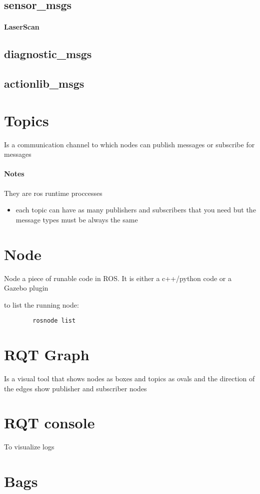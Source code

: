     \subsection{sensor\_msgs}
        \paragraph{LaserScan}
    \subsection{diagnostic\_msgs}
    \subsection{actionlib\_msgs}
\section{Topics}
    Is a communication channel to which nodes can publish messages or subscribe for messages

    \paragraph{Notes}
        They are ros runtime proccesses
        \begin{itemize}
            \item each topic can have as many publishers and subscribers that you need but the message types must be always the same
        \end{itemize}
\section{Node}
    Node a piece of runable code in ROS. It is either a c++/python code or a Gazebo plugin

    to list the running node:
    \begin{verbatim}
        rosnode list
    \end{verbatim}
\section{RQT Graph}
    Is a visual tool that shows nodes as boxes and topics as ovals and the direction of the edges show publisher and subscriber nodes
\section{RQT console}
    To visualize logs
\section{Bags}
